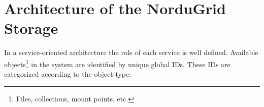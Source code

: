 \documentclass{llncs}
\begin{document}






\section{Architecture of the NorduGrid Storage}
\label{Architecture of the NorduGrid Storage}

In a service-oriented architecture
the role of each service is well defined. Available
objects\footnote{Files, collections, mount points, etc.} in the
system are identified by unique global IDs. These IDs are
categorized according to the object type:
\end{document}
